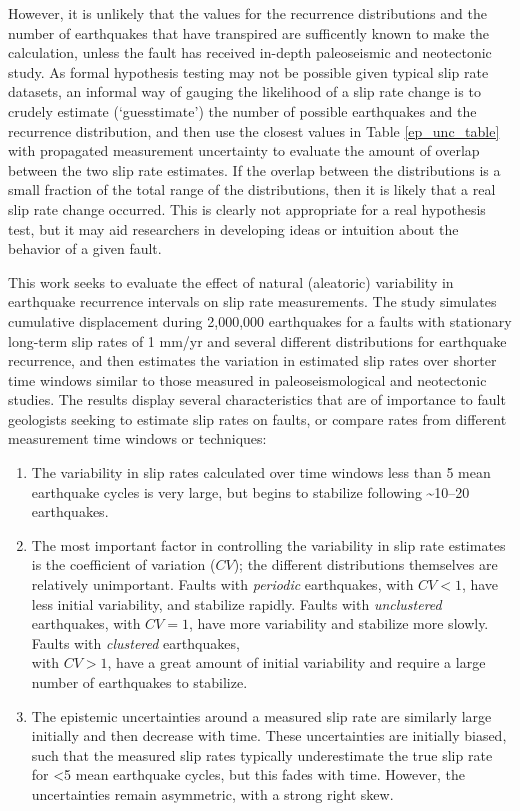 \documentclass[se]{copernicus}
\begin{document}
However, it is unlikely that the values for the recurrence distributions
and the number of earthquakes that have transpired are sufficently known
to make the calculation, unless the fault has received in-depth
paleoseismic and neotectonic study. As formal hypothesis testing may not
be possible given typical slip rate datasets, an informal way of gauging
the likelihood of a slip rate change is to crudely estimate
(`guesstimate') the number of possible earthquakes and the recurrence
distribution, and then use the closest values in Table
\ref{ep_unc_table} with propagated measurement uncertainty to evaluate
the amount of overlap between the two slip rate estimates. If the
overlap between the distributions is a small fraction of the total range
of the distributions, then it is likely that a real slip rate change
occurred. This is clearly not appropriate for a real hypothesis test,
but it may aid researchers in developing ideas or intuition about the
behavior of a given fault.

\conclusions

This work seeks to evaluate the effect of natural (aleatoric) variability in 
earthquake recurrence intervals on slip rate
measurements. The study simulates cumulative displacement during
2,000,000 earthquakes for a faults with stationary long-term slip rates
of 1 mm/yr and several different distributions for earthquake
recurrence, and then estimates the variation in estimated slip rates
over shorter time windows similar to those measured in
paleoseismological and neotectonic studies. The results display several
characteristics that are of importance to fault geologists seeking to
estimate slip rates on faults, or compare rates from different
measurement time windows or techniques:

\begin{enumerate}
\def\labelenumi{\arabic{enumi}.}
\item
  The variability in slip rates calculated over time windows less than 5
  mean earthquake cycles is very large, but begins to stabilize
  following \textasciitilde{}10--20 earthquakes.
\item
  The most important factor in controlling the variability in slip rate
  estimates is the coefficient of variation (\(CV\)); the different
  distributions themselves are relatively unimportant. Faults with
  \emph{periodic} earthquakes, with \(CV < 1\), have less initial
  variability, and stabilize rapidly. Faults with \emph{unclustered}
  earthquakes, with \(CV = 1\), have more variability and stabilize
  more slowly. Faults with \emph{clustered} earthquakes,\\
  with \(CV > 1\), have a great amount of initial variability and
  require a large number of earthquakes to stabilize.
\item
  The epistemic uncertainties around a measured slip rate are similarly
  large initially and then decrease with time. These uncertainties are
  initially biased, such that the measured slip rates typically
  underestimate the true slip rate for \textless{}5 mean earthquake
  cycles, but this fades with time. However, the uncertainties remain
  asymmetric, with a strong right skew.
\end{enumerate}
\end{document}
